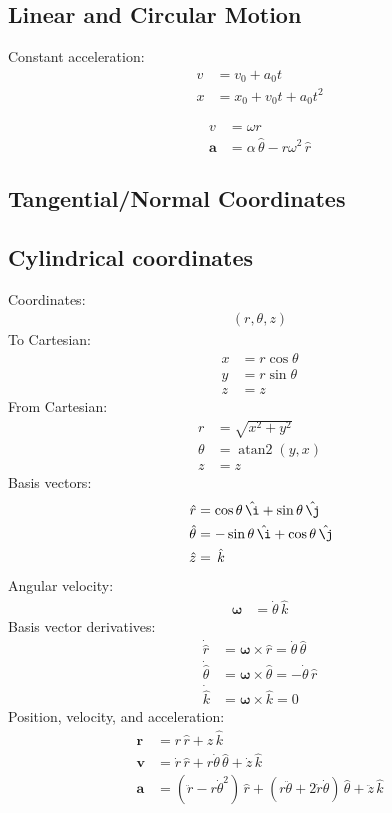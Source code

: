\documentclass{article}
\renewcommand{\vec}[1]{\boldsymbol{#1}}
\newcommand{\unit}[1]{\,\hat{#1}}
\begin{document}
\subsection{Linear and Circular Motion}

Constant acceleration:
\begin{align}
  v &= v_0 + a_0 t \\
  x &= x_0 + v_0 t + a_0 t^2
\end{align}

\begin{align}
  v &= \omega r \\
  \vec{a} &= \alpha \unit{\theta} - r \omega^2 \unit{r}
\end{align}

\subsection{Tangential/Normal Coordinates}

\subsection{Cylindrical coordinates}

Coordinates:
\begin{align}
  (r, \theta, z)
\end{align}
To Cartesian:
\begin{align}
  x &= r \cos\theta \\
  y &= r \sin\theta \\
  z &= z
\end{align}
From Cartesian:
\begin{align}
  r &= \sqrt{x^2 + y^2} \\
  \theta &= \operatorname{atan2}(y, x) \\
  z &= z
\end{align}
Basis vectors:
\begin{align}
  \unit{r} &= \cos\theta \unit{\i} + \sin\theta \unit{\j} \\
  \unit{\theta} &= - \sin\theta \unit{\i} + \cos\theta \unit{\j} \\
  \unit{z} &= \unit{k}
\end{align}
Angular velocity:
\begin{align}
  \vec{\omega} &= \dot\theta \unit{k}
\end{align}
Basis vector derivatives:
\begin{align}
  \dot{\hat{r}} &= \vec{\omega} \times \hat{r} = \dot\theta \unit{\theta} \\
  \dot{\hat{\theta}} &= \vec{\omega} \times \hat{\theta} = - \dot\theta \unit{r} \\
  \dot{\hat{k}} &= \vec{\omega} \times \hat{k} = 0
\end{align}
Position, velocity, and acceleration:
\begin{align}
  \vec{r} &= r \unit{r} + z \unit{k} \\
  \vec{v} &= \dot r \unit{r} + r \dot\theta \unit{\theta} + \dot z \unit{k} \\
  \vec{a} &= (\ddot r - r \dot\theta^2) \unit{r} + (r \ddot\theta + 2 \dot{r} \dot\theta) \unit{\theta} + \ddot z \unit{k}
\end{align}
\end{document}
